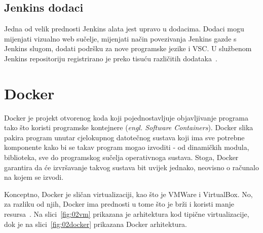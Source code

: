 \subsection{Jenkins dodaci}
Jedna od velik prednosti Jenkins alata jest upravo u dodacima. Dodaci mogu mijenjati vizualno web
sučelje, mijenjati način povezivanja Jenkins gazde s Jenkins slugom, dodati podršku za nove
programske jezike i VSC. U službenom Jenkins repositoriju registrirano je preko tisuću različitih
dodataka~\citep{JenkisPlugins}.


\section{Docker}
Docker je projekt otvorenog koda koji pojednostavljuje objavljivanje programa tako što koristi
programske kontejnere (\textit{engl. Software Containers}). Docker slika pakira program unutar
cjelokupnog datotečnog sustava koji ima sve potrebne komponente kako bi se takav program mogao
izvoditi - od dinamičkih modula, biblioteka, sve do programskog sučelja operativnoga sustava. Stoga,
Docker garantira da će izvršavanje takvog sustava bit uvijek jednako, neovisno o računalo na kojem
se izvodi.

Konceptno, Docker je sličan virtualizaciji, kao što je VMWare i VirtualBox. No, za razliku od njih,
Docker ima prednosti u tome što je brži i koristi manje resursa~\citep{leszko2017continuous}. Na
slici~\ref{fig:02vm} prikazana je arhitektura kod tipične virtualizacije, dok je na
slici~\ref{fig:02docker} prikazana  Docker arhitektura.

